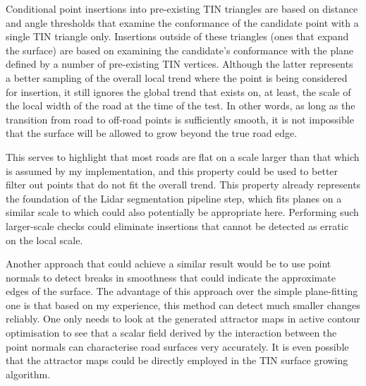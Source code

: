 Conditional point insertions into pre-existing TIN triangles are based on distance and angle thresholds that examine the conformance of the candidate point with a single TIN triangle only. Insertions outside of these triangles (ones that expand the surface) are based on examining the candidate's conformance with the plane defined by a number of pre-existing TIN vertices. Although the latter represents a better sampling of the overall local trend where the point is being considered for insertion, it still ignores the global trend that exists on, at least, the scale of the local width of the road at the time of the test. In other words, as long as the transition from road to off-road points is sufficiently smooth, it is not impossible that the surface will be allowed to grow beyond the true road edge.

This serves to highlight that most roads are flat on a scale larger than that which is assumed by my implementation, and this property could be used to better filter out points that do not fit the overall trend. This property already represents the foundation of the Lidar segmentation pipeline step, which fits planes on a similar scale to which could also potentially be appropriate here. Performing such larger-scale checks could eliminate insertions that cannot be detected as erratic on the local scale.

Another approach that could achieve a similar result would be to use point normals to detect breaks in smoothness that could indicate the approximate edges of the surface. The advantage of this approach over the simple plane-fitting one is that based on my experience, this method can detect much smaller changes reliably. One only needs to look at the generated attractor maps in active contour optimisation to see that a scalar field derived by the interaction between the point normals can characterise road surfaces very accurately. It is even possible that the attractor maps could be directly employed in the TIN surface growing algorithm.

